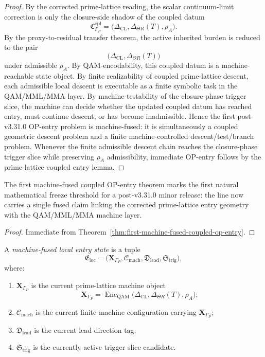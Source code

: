 \begin{proof}
By the corrected prime-lattice reading, the scalar continuum-limit correction is only the closure-side shadow of the coupled datum
\[
  \mathfrak{C}_{\Gamma_P}^{\mathrm{cpl}}
  =
  \bigl(\Delta_{\mathrm{CL}},\Delta_{\Theta R}(T),\rho_A\bigr).
\]
By the proxy-to-residual transfer theorem, the active inherited burden is reduced to the pair
\[
  \bigl(\Delta_{\mathrm{CL}},\Delta_{\Theta R}(T)\bigr)
\]
under admissible $\rho_A$.
By QAM-encodability, this coupled datum is a machine-reachable state object.
By finite realizability of coupled prime-lattice descent, each admissible local descent is executable as a finite symbolic task in the QAM/MML/MMA layer.
By machine-testability of the closure-phase trigger slice, the machine can decide whether the updated coupled datum has reached entry, must continue descent, or has become inadmissible.
Hence the first post-v3.31.0 OP-entry problem is machine-fused: it is simultaneously a coupled geometric descent problem and a finite machine-controlled descent/test/branch problem.
Whenever the finite admissible descent chain reaches the closure-phase trigger slice while preserving $\rho_A$ admissibility, immediate OP-entry follows by the prime-lattice coupled entry lemma.
\end{proof}

\begin{corollary}
\label{cor:first-post-v3310-freeze-threshold}
The first machine-fused coupled OP-entry theorem marks the first natural mathematical freeze threshold for a post-v3.31.0 minor release: the line now carries a single fused claim linking the corrected prime-lattice entry geometry with the QAM/MML/MMA machine layer.
\end{corollary}

\begin{proof}
Immediate from Theorem~\ref{thm:first-machine-fused-coupled-op-entry}.
\end{proof}


\begin{definition}
\label{def:machine-fused-local-entry-state}
A \emph{machine-fused local entry state} is a tuple
\[
\mathfrak{E}_{\mathrm{loc}}
=
\bigl(
\mathbf{X}_{\Gamma_P},
\mathcal{C}_{\mathrm{mach}},
\mathfrak{D}_{\mathrm{lead}},
\mathfrak{S}_{\mathrm{trig}}
\bigr),
\]
where:
\begin{enumerate}
    \item $\mathbf{X}_{\Gamma_P}$ is the current prime-lattice machine object
    \[
    \mathbf{X}_{\Gamma_P}
    =
    \operatorname{Enc}_{\mathrm{QAM}}
    \bigl(
    \Delta_{\mathrm{CL}},
    \Delta_{\Theta R}(T),
    \rho_A
    \bigr);
    \]
    \item $\mathcal{C}_{\mathrm{mach}}$ is the current finite machine configuration carrying $\mathbf{X}_{\Gamma_P}$;
    \item $\mathfrak{D}_{\mathrm{lead}}$ is the current lead-direction tag;
    \item $\mathfrak{S}_{\mathrm{trig}}$ is the currently active trigger slice candidate.
\end{enumerate}
\end{definition}

